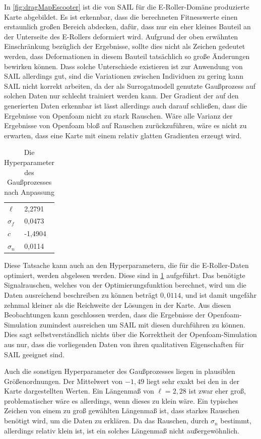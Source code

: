 In \cref{fig:dragMapEscooter} ist die von SAIL für die E-Roller-Domäne produzierte Karte abgebildet.
Es ist erkennbar, dass die berechneten Fitnesswerte einen erstaunlich großen Bereich abdecken, dafür, dass nur ein eher kleines Bauteil an der Unterseite des E-Rollers deformiert wird.
Aufgrund der oben erwähnten Einschränkung bezüglich der Ergebnisse, sollte dies nicht als Zeichen gedeutet werden, dass Deformationen in diesem Bauteil tatsächlich so große Änderungen bewirken können.
Dass solche Unterschiede existieren ist zur Anwendung von SAIL allerdings gut, sind die Variationen zwischen Individuen zu gering kann SAIL nicht korrekt arbeiten, da der als Surrogatmodell genutzte Gaußprozess auf solchen Daten nur schlecht trainiert werden kann.
Der Gradient der auf den generierten Daten erkennbar ist lässt allerdings auch darauf schließen, dass die Ergebnisse von Openfoam nicht zu stark Rauschen.
Wäre alle Varianz der Ergebnisse von Openfoam bloß auf Rauschen zurückzuführen, wäre es nicht zu erwarten, dass eine Karte mit einem relativ glatten Gradienten erzeugt wird.
\begin{table}[h]
	\centering
	\begin{tabularx}{.25\textwidth}{ll}\hline
		$\ell$ & 2,2791 \\
		$\sigma_f$ & 0,0473 \\
		$c$ & -1,4904 \\
		$\sigma_n$ & 0,0114 \\
	\end{tabularx}
	\label{tab:hyperparamsEscooter}
	\caption{Die Hyperparameter des Gaußprozesses nach Anpassung}
\end{table}
Diese Tatsache kann auch an den Hyperparametern, die für die E-Roller-Daten optimiert, werden abgelesen werden.
Diese sind in \cref{tab:hyperparamsEscooter} aufgeführt.
Das benötigte Signalrauschen, welches von der Optimierungsfunktion berechnet, wird um die Daten ausreichend beschreiben zu können beträgt $0,0114$, und ist damit ungefähr zehnmal kleiner als die Reichweite der Lösungen in der Karte.
Aus diesen Beobachtungen kann geschlossen werden, dass die Ergebnisse der Openfoam-Simulation zumindest ausreichen um SAIL mit diesen durchführen zu können.
Dies sagt selbstverständlich nichts über die Korrektheit der Openfoam-Simulation aus nur, dass die vorliegenden Daten von ihren qualitativen Eigenschaften für SAIL geeignet sind.

Auch die sonstigen Hyperparameter des Gaußprozesses liegen in plausiblen Größenordnungen.
Der Mittelwert von $-1,49$ liegt sehr exakt bei den in der Karte dargestellten Werten.
Ein Längenmaß von $\ell=2,28$ ist zwar eher groß, problematischer wäre es allerdings, wenn dieses zu klein wäre.
Ein typisches Zeichen von einem zu groß gewählten Längenmaß ist, dass starkes Rauschen benötigt wird, um die Daten zu erklären.
Da das Rauschen, durch $\sigma_n$ bestimmt, allerdings relativ klein ist, ist ein solches Längenmaß nicht außergewöhnlich.



